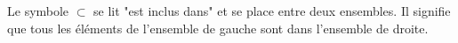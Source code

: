 \begin{rmq}
    Le symbole $\subset$ se lit "est inclus dans" et se place entre deux ensembles. Il signifie que tous les éléments de l'ensemble de gauche sont dans l'ensemble de droite.
\end{rmq}
    
%
%
%

